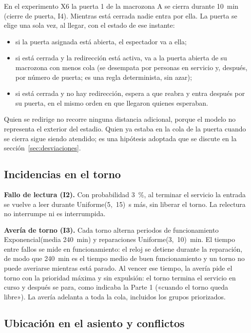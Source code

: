 En el experimento X6 la puerta 1 de la macrozona A se cierra durante 10~min
(cierre de puerta, I4). Mientras está cerrada nadie entra por ella. La puerta
se elige una sola vez, al llegar, con el estado de ese instante:

\begin{itemize}
  \item si la puerta asignada está abierta, el espectador va a ella;
  \item si está cerrada y la redirección está activa, va a la puerta abierta de
    su macrozona con menos cola (se desempata por personas en servicio y, después,
    por número de puerta; es una regla determinista, sin azar);
  \item si está cerrada y no hay redirección, espera a que reabra y entra después
    por su puerta, en el mismo orden en que llegaron quienes esperaban.
\end{itemize}

Quien se redirige no recorre ninguna distancia adicional, porque el modelo no
representa el exterior del estadio. Quien ya estaba en la cola de la puerta
cuando se cierra sigue siendo atendido; es una hipótesis adoptada que se discute
en la sección~\ref{sec:desviaciones}.

\subsection{Incidencias en el torno}

\textbf{Fallo de lectura (I2).} Con probabilidad 3~\%, al terminar el servicio
la entrada se vuelve a leer durante Uniforme(5,~15)~s más, sin liberar el torno.
La relectura no interrumpe ni es interrumpida.

\textbf{Avería de torno (I3).} Cada torno alterna periodos de funcionamiento
Exponencial(media 240~min) y reparaciones Uniforme(3,~10)~min. El tiempo entre
fallos se mide en funcionamiento: el reloj se detiene durante la reparación, de
modo que 240~min es el tiempo medio de buen funcionamiento y un torno no puede
averiarse mientras está parado. Al vencer ese tiempo, la avería pide el torno con
la prioridad máxima y sin expulsión: el torno termina el servicio en curso y
después se para, como indicaba la Parte 1 («cuando el torno queda libre»). La
avería adelanta a toda la cola, incluidos los grupos priorizados.

\subsection{Ubicación en el asiento y conflictos}

